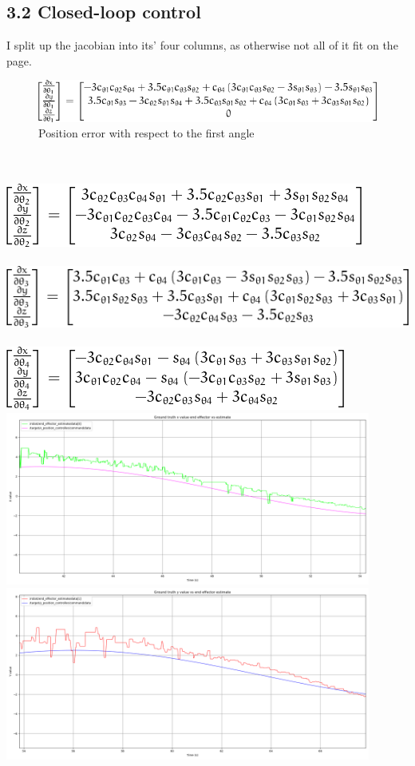 \subsection{3.2 Closed-loop control}
I split up the jacobian into its' four columns, as otherwise not all of it fit on the page. \\
\begin{figure}
	\includegraphics[]{jac_col1.png}
	\caption{Position error with respect to the first angle}
\end{figure} \\ \\
\includegraphics[]{jac_col2.png} \\ \\
\includegraphics[]{jac_col3.png} \\ \\
\includegraphics[]{jac_col4.png} \\
\includegraphics[width=0.9\textwidth]{plots/closed_x.png} \\
\includegraphics[width=0.9\textwidth]{plots/closed_y.png} \\
